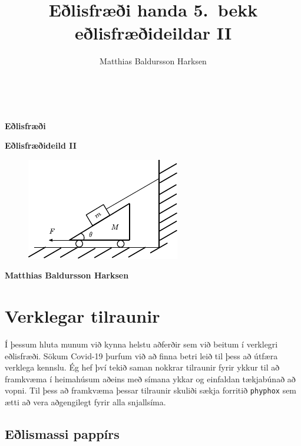 \documentclass[oneside]{book}
\title{Eðlisfræði handa 5.~bekk eðlisfræðideildar II}
\author{Matthias Baldursson Harksen}
\date{}
\theoremstyle{definition}
\begin{document}
\pagestyle{empty}

\,

\vspace{5cm}

\begin{center}
    \textbf{\Huge{Eðlisfræði}}
\end{center}

\begin{center}
    \textbf{\Large{Eðlisfræðideild II}}
\end{center}


\begin{figure}[H]
    \centering
    \includegraphics[scale = 2]{figures/forsidumynd.pdf}
\end{figure}

\vspace{7cm}

\begin{center}
    \textbf{\Large{Matthias Baldursson Harksen}}
\end{center}

\newpage

\tableofcontents

\chapter{Verklegar tilraunir}


Í þessum hluta munum við kynna helstu aðferðir sem við beitum í verklegri eðlisfræði. Sökum Covid-19 þurfum við að finna betri leið til þess að útfæra verklega kennslu. Ég hef því tekið saman nokkrar tilraunir fyrir ykkur til að framkvæma í heimahúsum aðeins með símana ykkar og einfaldan tækjabúnað að vopni. Til þess að framkvæma þessar tilraunir skuliði sækja forritið \verb|phyphox| sem ætti að vera aðgengilegt fyrir alla snjallsíma.

\newpage

\section{Eðlismassi pappírs}
\end{document}
